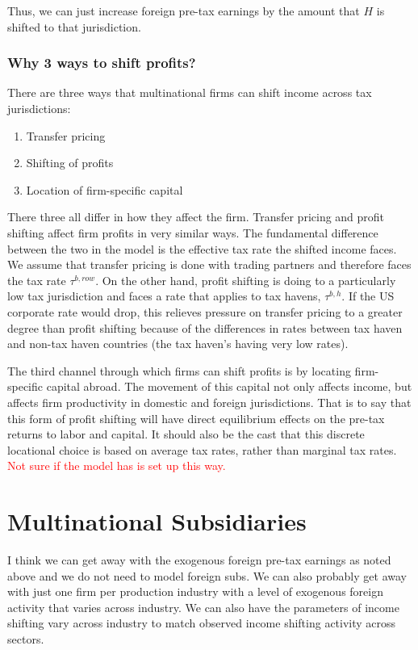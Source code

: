 Thus, we can just increase foreign pre-tax earnings by the amount that $H$ is shifted to that jurisdiction.

\subsubsection{Why 3 ways to shift profits?}

There are three ways that multinational firms can shift income across tax jurisdictions:
\begin{enumerate}
\item Transfer pricing
\item Shifting of profits
\item Location of firm-specific capital
\end{enumerate}

There three all differ in how they affect the firm.  Transfer pricing and profit shifting affect firm profits in very similar ways.  The fundamental difference between the two in the model is the effective tax rate the shifted income faces.  We assume that transfer pricing is done with trading partners and therefore faces the tax rate $\tau^{b,row}$.  On the other hand, profit shifting is doing to a particularly low tax jurisdiction and faces a rate that applies to tax havens, $\tau^{b,h}$.  If the US corporate rate would drop, this relieves pressure on transfer pricing to a greater degree than profit shifting because of the differences in rates between tax haven and non-tax haven countries (the tax haven's having very low rates).

The third channel through which firms can shift profits is by locating firm-specific capital abroad.  The movement of this capital not only affects income, but affects firm productivity in domestic and foreign jurisdictions.  That is to say that this form of profit shifting will have direct equilibrium effects on the pre-tax returns to labor and capital.  It should also be the cast that this discrete locational choice is based on average tax rates, rather than marginal tax rates.  \textcolor{red}{Not sure if the model has is set up this way.}

\section{Multinational Subsidiaries}

I think we can get away with the exogenous foreign pre-tax earnings as noted above and we do not need to model foreign subs.  We can also probably get away with just one firm per production industry with a level of exogenous foreign activity that varies across industry.  We can also have the parameters of income shifting vary across industry to match observed income shifting activity across sectors.

